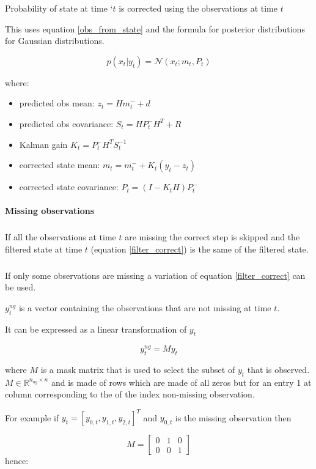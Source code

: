 \documentclass{article}
\begin{document}
Probability of state at time `$t$ is corrected using the observations at time $t$

This uses equation \ref{obs_from_state} and the formula for posterior distributions for Gaussian distributions.

\begin{equation}\label{filter_correct}
 p(x_t|y_t) = \mathcal{N}(x_t; m_t, P_t)   
\end{equation}
    
where:

\begin{itemize}
    \item predicted obs mean: $z_t = Hm_t^- + d$   
    \item predicted obs covariance: $S_t = HP_t^-H^T + R$
    \item Kalman gain $K_t = P_t^-H^TS_t^{-1}$ 
    \item corrected state mean: $m_t = m_t^- + K_t(y_t - z_t)$ 
    \item corrected state covariance: $P_t = (I-K_tH)P_t^-$ 
\end{itemize}

\paragraph{Missing observations}

\subparagraph{}
If all the observations at time $t$ are missing the correct step is skipped and the filtered state at time $t$ (equation \ref{filter_correct}) is the same of the filtered state.

\subparagraph{}
If only some observations are missing a variation of equation \ref{filter_correct} can be used.

$y^{ng}_t$ is a vector containing the observations that are not missing at time $t$. 

It can be expressed as a linear transformation of $y_t$

$$ y^{ng}_t = My_t$$

where $M$ is a mask matrix that is used to select the subset of $y_t$ that is observed. $M \in \mathbb{R}^{n_{ng} \times n}$ and is made of rows which are made of all zeros but for an entry 1 at column corresponding to the of the index non-missing observation.

For example if $y_t = [y_{0,t}, y_{1,t}, y_{2,t}]^T$ and $y_{0,t}$ is the missing observation then

$$ M = \left[\begin{array}{ccc}
    0 & 1 & 0 \\
    0 & 0 & 1
\end{array}\right]$$
hence:
\end{document}
